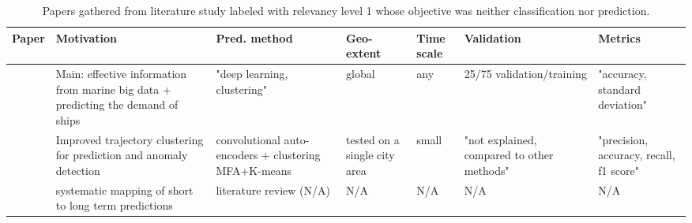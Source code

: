 \noindent
\begin{table}[t]
{\small\begin{tabularx}{1.2\textwidth}{p{0.6in} X X p{0.5in} p{0.4in} X p{0.5in}}
    \toprule
    \textbf{Paper} & \textbf{Motivation} & \textbf{Pred. method} & \textbf{Geo-extent} & \textbf{Time scale} & \textbf{Validation} & \textbf{Metrics} \\ \midrule
    \cite{Hamada2021DevelopmentPlanning} & Main: effective information from marine big data + predicting the demand of ships & "deep learning, clustering" & global & any & 25/75 validation/training & "accuracy, standard deviation" \\ \midrule
    \cite{Wang2021AISAuto-encoder} & Improved trajectory clustering for prediction and anomaly detection & convolutional auto-encoders + clustering MFA+K-means & tested on a single city area & small & "not explained, compared to other methods" & "precision, accuracy, recall, f1 score" \\ \midrule
    \cite{Dobrkovic2015TowardsTimes} & systematic mapping of short to long term predictions & literature review (N/A) & N/A & N/A & N/A & N/A \\ \bottomrule
\end{tabularx}}
\caption{Papers gathered from literature study labeled with relevancy level 1 whose objective was neither classification nor prediction.}
\label{tab:lit_review_cat_1_4}
\end{table}


